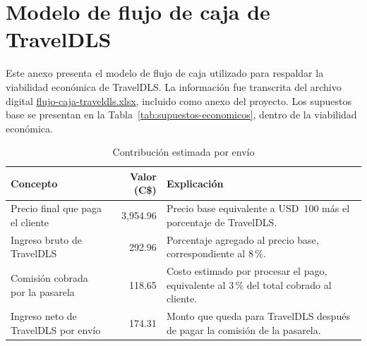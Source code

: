 \clearpage
\appendix
{}
{}

\section{Modelo de flujo de caja de TravelDLS}
\label{anexo:flujo-caja}

Este anexo presenta el modelo de flujo de caja utilizado para respaldar la viabilidad económica de TravelDLS. La información fue transcrita del archivo digital \href{run:anexos/flujo-caja-traveldls.xlsx}{flujo-caja-traveldls.xlsx}, incluido como anexo del proyecto. Los supuestos base se presentan en la Tabla~\ref{tab:supuestos-economicos}, dentro de la viabilidad económica.

\begin{table}[H]
\centering
\caption{Contribución estimada por envío}
\label{tab:anexo-contribucion-envio}
\begin{tabularx}{\textwidth}{>{\RaggedRight\arraybackslash}X r >{\RaggedRight\arraybackslash}X}
\toprule
Concepto & Valor (C\$) & Explicación \\
\midrule
Precio final que paga el cliente & 3,954.96 & Precio base equivalente a USD~100 más el porcentaje de TravelDLS. \\
Ingreso bruto de TravelDLS & 292.96 & Porcentaje agregado al precio base, correspondiente al 8\,\%. \\
Comisión cobrada por la pasarela & 118.65 & Costo estimado por procesar el pago, equivalente al 3\,\% del total cobrado al cliente. \\
Ingreso neto de TravelDLS por envío & 174.31 & Monto que queda para TravelDLS después de pagar la comisión de la pasarela. \\
\bottomrule
\end{tabularx}
\end{table}

\begin{table}[H]
\centering
\caption{Flujo de caja proyectado}
\label{tab:anexo-flujo-caja-proyectado}
{\small
\setlength{\tabcolsep}{4pt}
}
\end{table}

